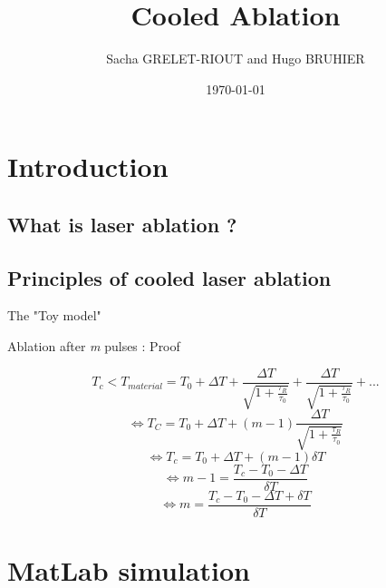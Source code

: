 \documentclass[11pt]{beamer}
\author{Sacha GRELET-RIOUT and Hugo BRUHIER}
\title{Cooled Ablation}
\institute{Télécom Saint-Étienne}
\date{\today}
\begin{document}

\begin{frame}
\titlepage
\end{frame}

\begin{frame}
\tableofcontents
\end{frame}

\section{Introduction}
\subsection{What is laser ablation ?}
\begin{frame}{}

\end{frame}

\subsection{Principles of cooled laser ablation}
\begin{frame}{The "Toy model"}

\end{frame}

\begin{frame}{Ablation after \emph{m} pulses : Proof}

$$
T_c < T_{material} = T_0 + \Delta T + \frac{\Delta T}{\sqrt{1+\frac{\tau_R}{\tau_0}}} + \frac{\Delta T}{\sqrt{1+\frac{\tau_R}{\tau_0}}} + ...
$$
$$
\Leftrightarrow T_C = T_0 + \Delta T + (m-1) \frac{\Delta T}{\sqrt{1+\frac{\tau_R}{\tau_0}}}
$$
$$
\Leftrightarrow T_c = T_0 + \Delta T + (m-1) \delta T
$$
$$
\Leftrightarrow m-1 = \frac{T_c - T_0 - \Delta T}{\delta T}
$$
\begin{equation}
\Leftrightarrow \boxed{m = \frac{T_c - T_0 - \Delta T + \delta T}{\delta T}}
\end{equation}


\end{frame}


\section{MatLab simulation}
\end{document}
